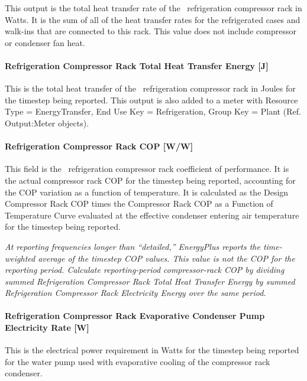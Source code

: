 This output is the total heat transfer rate of the~ refrigeration compressor rack in Watts. It is the sum of all of the heat transfer rates for the refrigerated cases and walk-ins that are connected to this rack. This value does not include compressor or condenser fan heat.

\paragraph{Refrigeration Compressor Rack Total Heat Transfer Energy {[}J{]}}\label{refrigeration-compressor-rack-total-heat-transfer-energy-j}

This is the total heat transfer of the~ refrigeration compressor rack in Joules for the timestep being reported. This output is also added to a meter with Resource Type = EnergyTransfer, End Use Key = Refrigeration, Group Key = Plant (Ref. Output:Meter objects).

\paragraph{Refrigeration Compressor Rack COP {[}W/W{]}}\label{refrigeration-compressor-rack-cop-ww}

This field is the~ refrigeration compressor rack coefficient of performance. It is the actual compressor rack COP for the timestep being reported, accounting for the COP variation as a function of temperature. It is calculated as the Design Compressor Rack COP times the Compressor Rack COP as a Function of Temperature Curve evaluated at the effective condenser entering air temperature for the timestep being reported.

\emph{At reporting frequencies longer than ``detailed,'' EnergyPlus reports the time-weighted average of the timestep COP values. This value is not the COP for the reporting period. Calculate reporting-period compressor-rack COP by dividing summed Refrigeration Compressor Rack Total Heat Transfer Energy by summed Refrigeration Compressor Rack Electricity Energy over the same period.}

\paragraph{Refrigeration Compressor Rack Evaporative Condenser Pump Electricity Rate {[}W{]}}\label{refrigeration-compressor-rack-evaporative-condenser-pump-electric-power-w}

This is the electrical power requirement in Watts for the timestep being reported for the water pump used with evaporative cooling of the compressor rack condenser.

